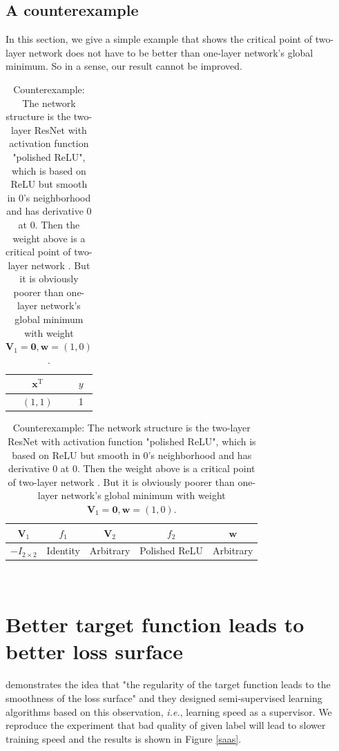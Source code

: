 \documentclass{article}
\theoremstyle{plain}
\theoremstyle{definition}
\begin{document}
\subsection{A counterexample}
In this section, we give a simple example that shows the critical point of two-layer network does not have to be better
than one-layer network's global minimum. So in a sense, our result cannot be improved.

\begin{table}[H]
\begin{minipage}[t]{0.3\linewidth}
\centering
\begin{tabular}{|c|c|}
\hline $\mathbf x^\mathrm{T}$&$y$\\
\hline $(1,1)$&1\\
\hline
\end{tabular}
\end{minipage}
\begin{minipage}[t]{0.5\linewidth}
\centering
\begin{tabular}{|c|c|c|c|c|}
\hline $\mathbf V_1$&$f_1$&$\mathbf V_2$&$f_2$&$\mathbf w$\\
\hline $-I_{2\times 2}$&Identity&Arbitrary&Polished ReLU&Arbitrary\\
\hline
\end{tabular}
\end{minipage}
\\
\caption{Counterexample: The network structure is the two-layer ResNet with activation function "polished ReLU",
which is based on ReLU but smooth in 0's neighborhood and has derivative 0 at 0. Then the weight above is a critical point of two-layer network . But it is obviously poorer than one-layer network's global minimum with weight $\mathbf V_1=\mathbf 0, \mathbf w=(1,0)$.}
\end{table}


\section{Better target function leads to better loss surface}

\cite{cicek2018saas,cicek2018input} demonstrates the idea that "the regularity of the target function leads to the smoothness of the loss surface" and they designed semi-supervised learning algorithms based on this observation, \emph{i.e.}, learning speed as a supervisor. We reproduce the experiment that bad quality of given label will lead to slower training speed and the results is shown in Figure \ref{saas}.
\end{document}
